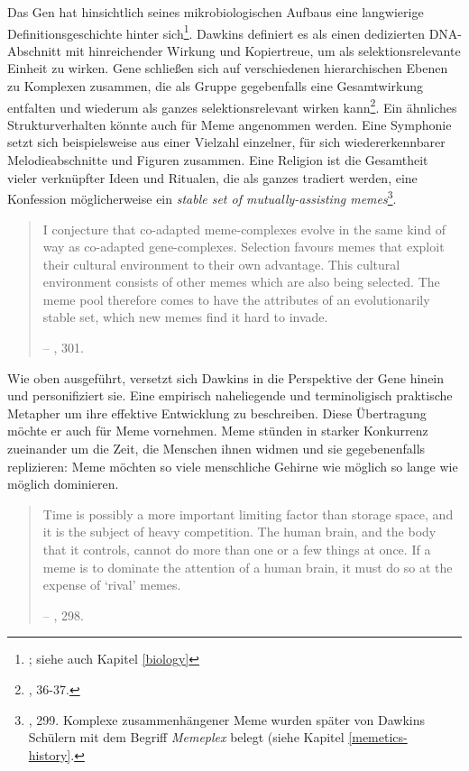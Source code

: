 \documentclass[openany,twoside,twocolumn]{book}
\let\rmarkdownfootnote\footnote%
\def\footnote{\protect\rmarkdownfootnote}
\begin{document}
Das Gen hat hinsichtlich seines mikrobiologischen Aufbaus eine
langwierige Definitionsgeschichte hinter sich\footnote{\textcite{gerstein_what_2007};
  siehe auch Kapitel \ref{biology}}. Dawkins definiert es als einen
dedizierten DNA-Abschnitt mit hinreichender Wirkung und Kopiertreue, um
als selektionsrelevante Einheit zu wirken. Gene schließen sich auf
verschiedenen hierarchischen Ebenen zu Komplexen zusammen, die als
Gruppe gegebenfalls eine Gesamtwirkung entfalten und wiederum als ganzes
selektionsrelevant wirken kann\footnote{\textcite{Dawkinsselfishgene40th2016},
  36-37.}. Ein ähnliches Strukturverhalten könnte auch für Meme
angenommen werden. Eine Symphonie setzt sich beispielsweise aus einer
Vielzahl einzelner, für sich wiedererkennbarer Melodieabschnitte und
Figuren zusammen. Eine Religion ist die Gesamtheit vieler verknüpfter
Ideen und Ritualen, die als ganzes tradiert werden, eine Konfession
möglicherweise ein \emph{stable set of mutually-assisting
memes}\footnote{\textcite{Dawkinsselfishgene40th2016}, 299. Komplexe
  zusammenhängener Meme wurden später von Dawkins Schülern mit dem
  Begriff \emph{Memeplex} belegt (siehe Kapitel \ref{memetics-history}.}.

\begin{quote}
I conjecture that co-adapted meme-complexes evolve in the same kind of
way as co-adapted gene-complexes. Selection favours memes that exploit
their cultural environment to their own advantage. This cultural
environment consists of other memes which are also being selected. The
meme pool therefore comes to have the attributes of an evolutionarily
stable set, which new memes find it hard to invade.

-- \textcite{Dawkinsselfishgene40th2016}, 301.
\end{quote}

Wie oben ausgeführt, versetzt sich Dawkins in die Perspektive der Gene
hinein und personifiziert sie. Eine empirisch naheliegende und
terminoligisch praktische Metapher um ihre effektive Entwicklung zu
beschreiben. Diese Übertragung möchte er auch für Meme vornehmen. Meme
stünden in starker Konkurrenz zueinander um die Zeit, die Menschen ihnen
widmen und sie gegebenenfalls replizieren: Meme möchten so viele
menschliche Gehirne wie möglich so lange wie möglich dominieren.

\begin{quote}
Time is possibly a more important limiting factor than storage space,
and it is the subject of heavy competition. The human brain, and the
body that it controls, cannot do more than one or a few things at once.
If a meme is to dominate the attention of a human brain, it must do so
at the expense of `rival' memes.

-- \textcite{Dawkinsselfishgene40th2016}, 298.
\end{quote}
\end{document}
